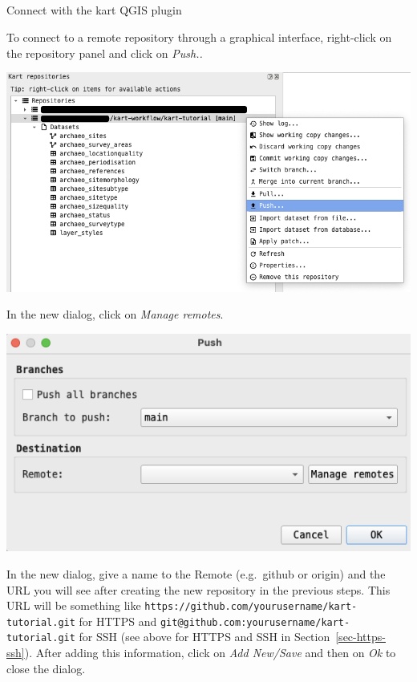 \documentclass[
  letterpaper,
  DIV=11,
  numbers=noendperiod]{scrartcl}
\makeatletter
\let\oldsubparagraph\subparagraph
\renewcommand{\subparagraph}{
    \@ifstar
      \xxxSubParagraphStar
      \xxxSubParagraphNoStar
  }
\newcommand{\xxxSubParagraphStar}[1]{\oldsubparagraph*{#1}\mbox{}}
\newcommand{\xxxSubParagraphNoStar}[1]{\oldsubparagraph{#1}\mbox{}}
\makeatother
\begin{document}
\subparagraph{Connect with the kart QGIS
plugin}\label{connect-with-the-kart-qgis-plugin}

To connect to a remote repository through a graphical interface,
right-click on the repository panel and click on \emph{Push..}

\begin{center}
\includegraphics{img/kart-panel-push.png}
\end{center}

In the new dialog, click on \emph{Manage remotes}.

\begin{center}
\includegraphics{img/kart-panel-push-manage.png}
\end{center}

In the new dialog, give a name to the Remote (e.g.~github or origin) and
the URL you will see after creating the new repository in the previous
steps. This URL will be something like
\texttt{https://github.com/yourusername/kart-tutorial.git} for HTTPS and
\texttt{git@github.com:\textasciigrave{}\textasciigrave{}yourusername\textasciigrave{}\textasciigrave{}/kart-tutorial.git}
for SSH (see above for HTTPS and SSH in Section~\ref{sec-https-ssh}).
After adding this information, click on \emph{Add New/Save} and then on
\emph{Ok} to close the dialog.
\end{document}
